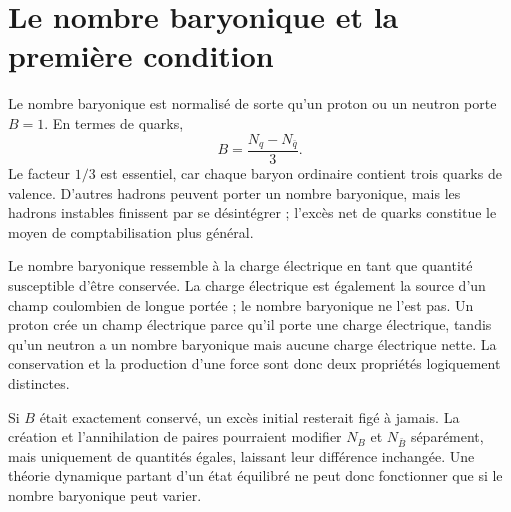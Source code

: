 \section{Le nombre baryonique et la première condition}

Le nombre baryonique est normalisé de sorte qu’un proton ou un neutron porte \(B=1\). En termes de quarks,
\begin{equation}
B=\frac{N_q-N_{\bar q}}{3}.
\label{eq:c08-baryon-number}
\end{equation}
Le facteur \(1/3\) est essentiel, car chaque baryon ordinaire contient trois quarks de valence. D’autres hadrons peuvent porter un nombre baryonique, mais les hadrons instables finissent par se désintégrer ; l’excès net de quarks constitue le moyen de comptabilisation plus général.

\begin{classroomqa}
\end{classroomqa}

Le nombre baryonique ressemble à la charge électrique en tant que quantité susceptible d’être conservée. La charge électrique est également la source d’un champ coulombien de longue portée ; le nombre baryonique ne l’est pas. Un proton crée un champ électrique parce qu’il porte une charge électrique, tandis qu’un neutron a un nombre baryonique mais aucune charge électrique nette. La conservation et la production d’une force sont donc deux propriétés logiquement distinctes.

\begin{classroomqa}
\end{classroomqa}

Si \(B\) était exactement conservé, un excès initial resterait figé à jamais. La création et l’annihilation de paires pourraient modifier \(N_B\) et \(N_{\bar B}\) séparément, mais uniquement de quantités égales, laissant leur différence inchangée. Une théorie dynamique partant d’un état équilibré ne peut donc fonctionner que si le nombre baryonique peut varier.

